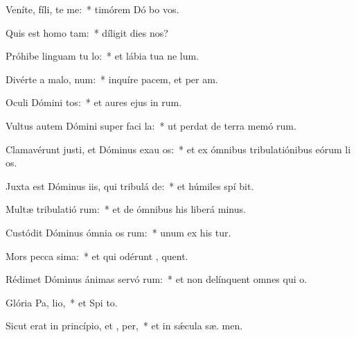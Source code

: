 \item Veníte, fíli, te me:~* timórem Dó bo vos.
\item Quis est homo   tam:~* díligit dies  nos?
\item Próhibe linguam tu  lo:~* et lábia tua ne  lum.
\item Divérte a malo,   num:~* inquíre pacem, et per am.
\item Oculi Dómini  tos:~* et aures ejus in  rum.
\item Vultus autem Dómini super faci la:~* ut perdat de terra memó rum.
\item Clamavérunt justi, et Dóminus exau os:~* et ex ómnibus tribulatiónibus eórum li os.
\item Juxta est Dóminus iis, qui tribulá  de:~* et húmiles spí bit.
\item Multæ tribulatió rum:~* et de ómnibus his liberá  minus.
\item Custódit Dóminus ómnia os rum:~* unum ex his  tur.
\item Mors pecca sima:~* et qui odérunt , quent.
\item Rédimet Dóminus ánimas servó rum:~* et non delínquent omnes qui   o.
\item Glória Pa,  lio,~* et Spi to.
\item Sicut erat in princípio, et ,  per,~* et in sǽcula sæ. men.
